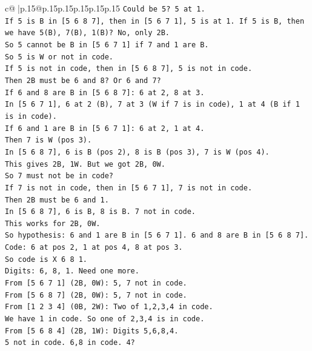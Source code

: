\documentclass{article}
\begin{document}
{\begin{supertabular}{c@{$\;$}|p{.15\linewidth}@{}p{.15\linewidth}p{.15\linewidth}p{.15\linewidth}p{.15\linewidth}p{.15\linewidth}}
{{{\texttt{Could be 5? 5 at 1.} \\
\texttt{If 5 is B in {[}5 6 8 7{]}, then in {[}5 6 7 1{]}, 5 is at 1. If 5 is B, then we have 5(B), 7(B), 1(B)? No, only 2B.} \\
\texttt{So 5 cannot be B in {[}5 6 7 1{]} if 7 and 1 are B.} \\
\texttt{So 5 is W or not in code.} \\
\texttt{If 5 is not in code, then in {[}5 6 8 7{]}, 5 is not in code.} \\
\texttt{Then 2B must be 6 and 8? Or 6 and 7?} \\
\texttt{If 6 and 8 are B in {[}5 6 8 7{]}: 6 at 2, 8 at 3.} \\
\texttt{In {[}5 6 7 1{]}, 6 at 2 (B), 7 at 3 (W if 7 is in code), 1 at 4 (B if 1 is in code).} \\
\texttt{If 6 and 1 are B in {[}5 6 7 1{]}: 6 at 2, 1 at 4.} \\
\texttt{Then 7 is W (pos 3).} \\
\texttt{In {[}5 6 8 7{]}, 6 is B (pos 2), 8 is B (pos 3), 7 is W (pos 4).} \\
\texttt{This gives 2B, 1W. But we got 2B, 0W.} \\
\texttt{So 7 must not be in code?} \\
\texttt{If 7 is not in code, then in {[}5 6 7 1{]}, 7 is not in code.} \\
\texttt{Then 2B must be 6 and 1.} \\
\texttt{In {[}5 6 8 7{]}, 6 is B, 8 is B. 7 not in code.} \\
\texttt{This works for 2B, 0W.} \\
\texttt{So hypothesis: 6 and 1 are B in {[}5 6 7 1{]}. 6 and 8 are B in {[}5 6 8 7{]}.} \\
\texttt{Code: 6 at pos 2, 1 at pos 4, 8 at pos 3.} \\
\texttt{So code is X 6 8 1.} \\
\texttt{Digits: 6, 8, 1. Need one more.} \\
\texttt{From {[}5 6 7 1{]} (2B, 0W): 5, 7 not in code.} \\
\texttt{From {[}5 6 8 7{]} (2B, 0W): 5, 7 not in code.} \\
\texttt{From {[}1 2 3 4{]} (0B, 2W): Two of 1,2,3,4 in code.} \\
\texttt{We have 1 in code. So one of 2,3,4 is in code.} \\
\texttt{From {[}5 6 8 4{]} (2B, 1W): Digits 5,6,8,4.} \\
\texttt{5 not in code. 6,8 in code. 4?} \\
}}}
\end{supertabular}}
\end{document}
